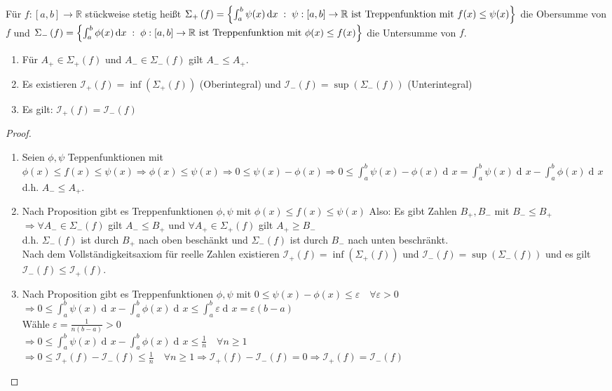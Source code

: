 \documentclass[a4paper,titlepage,oneside]{article}
\def\R{\ensuremath{\mathbb{R}} }
\renewcommand{\epsilon}{\ensuremath{\varepsilon} }
\newcommand{\der}{\operatorname{d\!}{}}
\def\sp{\hspace{0,1cm}}
\newcommand{\menge}[2]{\ensuremath{\left\{#1\sp : \sp #2\right\}}}
\newcommand{\integral}[4][x]{\ensuremath{\int_{#2}^{#3}{#4\der #1}}}
\newcommand{\intAB}[2][x]{\integral[#1]{a}{b}{#2}}
\newcommand{\OS}[1]{\ensuremath{\Sigma_+\left(#1\right)}}
\newcommand{\US}[1]{\ensuremath{\Sigma_-\left(#1\right)}}
\newcommand{\OI}[1]{\ensuremath{\mathcal{I}_+\left(#1\right)}}
\newcommand{\UI}[1]{\ensuremath{\mathcal{I}_-\left(#1\right)}}
\theoremstyle{thmstyle}
\begin{document}
\begin{defi}
Für $f :[a,b] \to \R$ stückweise stetig heißt $ \OS{f} = \menge{\intAB{\psi(x)}}{\psi : [a,b] \to \R \text{ ist Treppenfunktion mit } f(x) \le \psi(x)}$ die Obersumme von $f$ und $ \US{f} = \menge{\intAB{\phi(x)}}{\phi : [a,b] \to \R \text{ ist Treppenfunktion mit } \phi(x) \le f(x)}$ die Untersumme von $f$.
\end{defi}

\begin{satz}
\begin{enumerate}
\item Für $A_+ \in \OS{f}$ und $A_- \in \US{f}$ gilt $A_- \le A_+$.
\item Es existieren $\OI{f} = \inf(\OS{f})$ (Oberintegral) und  $\UI{f} = \sup(\US{f})$ (Unterintegral)
\item Es gilt: $\OI{f} = \UI{f}$
\end{enumerate}
\begin{proof}
\begin{enumerate}
\item Seien $\phi, \psi$ Teppenfunktionen mit $ \phi(x) \le f(x) \le \psi(x) \Rightarrow \phi(x) \le \psi(x) \Rightarrow 0 \le \psi(x) - \phi(x) \Rightarrow 0 \le \intAB{\psi(x) - \phi(x)} = \intAB{\psi(x)} - \intAB{\phi(x)}$ d.h. $A_- \le A_+$.
\item Nach Proposition gibt es Treppenfunktionen $\phi, \psi$ mit $\phi(x) \le f(x) \le \psi(x)$ Also: Es gibt Zahlen $B_+, B_-$ mit $B_- \le B_+$\\
$\Rightarrow \forall A_- \in \US{f}$ gilt $ A_- \le B_+$ und $\forall A_+ \in \OS{f}$ gilt $ A_+ \ge B_-$\\
d.h. $\US{f}$ ist durch $B_+$ nach oben beschänkt und $\US{f}$ ist durch $B_-$ nach unten beschränkt.\\
Nach dem Vollständigkeitsaxiom für reelle Zahlen existieren $\OI{f}  = \inf(\OS{f})$ und $\UI{f} = \sup(\US{f})$ und es gilt $\UI{f} \le \OI{f}$.
\item Nach Proposition gibt es Treppenfunktionen $\phi, \psi$ mit $ 0 \le \psi(x) - \phi(x) \le \epsilon \quad \forall \epsilon > 0$\\
$\Rightarrow 0 \le \intAB{\psi(x)} - \intAB{\phi(x)} \le \intAB{\epsilon} = \epsilon(b-a)$\\
Wähle $\displaystyle \epsilon = \frac{1}{n(b-a)} > 0$\\
$\Rightarrow 0 \le \intAB{\psi(x)} - \intAB{\phi(x)} \le \frac{1}{n} \quad \forall n \ge 1$ \\
$\Rightarrow 0 \le \OI{f} - \UI{f} \le \frac{1}{n} \quad \forall n \ge 1 \Rightarrow \OI{f} - \UI{f} = 0 \Rightarrow \OI{f} = \UI{f}$
\end{enumerate}
\end{proof}
\end{satz}
 
\end{document}

